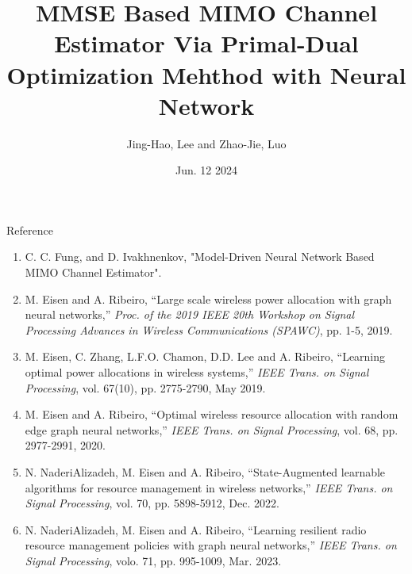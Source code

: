 \documentclass[hyperref={bookmarks=false}]{beamer}
\title{MMSE Based MIMO Channel Estimator Via Primal-Dual
Optimization Mehthod with Neural Network}
\author{Jing-Hao, Lee and Zhao-Jie, Luo}
\institute[NYCU] %
{
\\
\medskip
Advisor: Professor Carrson C. Fung\\ 
\medskip
National Yang Ming Chiao Tung University \\ %
}
\date{Jun. 12 2024}
\numberwithin{figure}{section}
\begin{document}
\frame{\titlepage}

\begin{frame}{Reference}
\begin{enumerate}
    \item C. C. Fung, and D. Ivakhnenkov, "Model-Driven Neural Network Based MIMO Channel Estimator".
    \item M. Eisen and A. Ribeiro, ``Large scale wireless power allocation with graph neural networks,'' \emph{Proc. of the 2019 IEEE 20th Workshop on Signal Processing Advances in Wireless Communications (SPAWC)}, pp. 1-5, 2019.
    \item M. Eisen, C. Zhang, L.F.O. Chamon, D.D. Lee and A. Ribeiro, ``Learning optimal power allocations in wireless systems,'' \emph{IEEE Trans. on Signal Processing}, vol. 67(10), pp. 2775-2790, May 2019.
    \item M. Eisen and A. Ribeiro, ``Optimal wireless resource allocation with random edge graph neural networks,'' \emph{IEEE Trans. on Signal Processing}, vol. 68, pp. 2977-2991, 2020.
    \item N. NaderiAlizadeh, M. Eisen and A. Ribeiro, ``State-Augmented learnable algorithms for resource management in wireless networks,'' \emph{IEEE Trans. on Signal Processing}, vol. 70, pp. 5898-5912, Dec. 2022.
    \item N. NaderiAlizadeh, M. Eisen and A. Ribeiro, ``Learning resilient radio resource management policies with graph neural networks,'' \emph{IEEE Trans. on Signal Processing}, volo. 71, pp. 995-1009, Mar. 2023.
\end{enumerate}

\end{frame}
\end{document}
